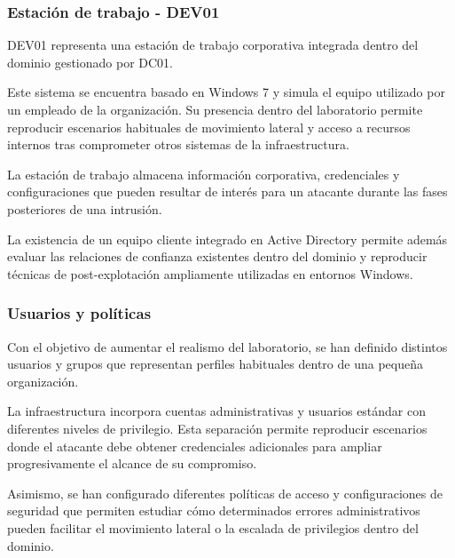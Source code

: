 
\subsubsection{Estación de trabajo - DEV01}

DEV01 representa una estación de trabajo corporativa integrada dentro del dominio gestionado por DC01.

Este sistema se encuentra basado en Windows 7 y simula el equipo utilizado por un empleado de la organización. Su presencia dentro del laboratorio permite reproducir escenarios habituales de movimiento lateral y acceso a recursos internos tras comprometer otros sistemas de la infraestructura.

La estación de trabajo almacena información corporativa, credenciales y configuraciones que pueden resultar de interés para un atacante durante las fases posteriores de una intrusión.

La existencia de un equipo cliente integrado en Active Directory permite además evaluar las relaciones de confianza existentes dentro del dominio y reproducir técnicas de post-explotación ampliamente utilizadas en entornos Windows.


\subsubsection{Usuarios y políticas}

Con el objetivo de aumentar el realismo del laboratorio, se han definido distintos usuarios y grupos que representan perfiles habituales dentro de una pequeña organización.

La infraestructura incorpora cuentas administrativas y usuarios estándar con diferentes niveles de privilegio. Esta separación permite reproducir escenarios donde el atacante debe obtener credenciales adicionales para ampliar progresivamente el alcance de su compromiso.

Asimismo, se han configurado diferentes políticas de acceso y configuraciones de seguridad que permiten estudiar cómo determinados errores administrativos pueden facilitar el movimiento lateral o la escalada de privilegios dentro del dominio.


